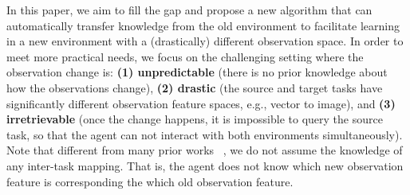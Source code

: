 




In this paper, we aim to fill the gap and propose a new algorithm that can automatically transfer knowledge from the old environment to facilitate learning in a new environment with a (drastically) different observation space.
In order to meet more practical needs, we focus on the challenging setting where the observation change is: 
\textbf{(1) unpredictable} (there is no prior knowledge about how the observations change), 
\textbf{(2) drastic} (the source and target tasks have significantly different observation feature spaces, e.g., vector to image), and
\textbf{(3) irretrievable} (once the change happens, it is impossible to query the source task, so that the agent can not interact with both environments simultaneously).
Note that different from many prior works ~\citep{taylor2007transfer,mann2013directed}, we do not assume the knowledge of any inter-task mapping. That is, the agent does not know which new observation feature is corresponding the which old observation feature.
% 



